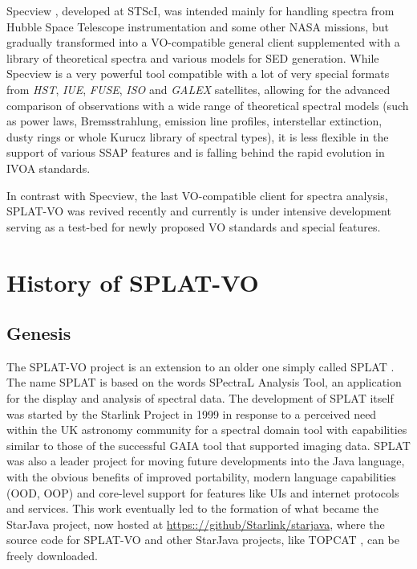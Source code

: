 \documentclass[final,authoryear,5p,times,twocolumn]{elsarticle}
\begin{document}
Specview \citep[][]{2002SPIE.4847..410B}, developed at
STScI, was intended mainly for handling spectra from Hubble Space
Telescope instrumentation and some other NASA missions, but gradually
transformed into a VO-compatible general client supplemented with a
library of theoretical spectra and various models for SED generation.
While Specview is a very powerful tool compatible with a lot of very
special formats from \emph{HST}, \emph{IUE}, \emph{FUSE}, \emph{ISO}
and \emph{GALEX} satellites, allowing for the advanced comparison of
observations with a wide range of theoretical spectral models (such as
power laws, Bremsstrahlung, emission line profiles, interstellar
extinction, dusty rings or whole Kurucz library of spectral types), it
is less flexible in the support of various SSAP features and is falling
behind the rapid evolution in IVOA standards.

In contrast with Specview, the last VO-compatible client for spectra analysis,
SPLAT-VO \citep[][]{sun243} was revived recently and currently
is under intensive development serving as a test-bed for newly proposed VO
standards and special features.




\section{History of SPLAT-VO}
\subsection{Genesis}

The SPLAT-VO project is an extension to an older one simply called
SPLAT \citep[][]{2002ASPC..281..513B}.  The name SPLAT
is based on the words SPectraL Analysis Tool, an application for the
display and analysis of spectral data. The development of SPLAT itself
was started by the Starlink Project \citep{1982QJRAS..23..485D} in
1999 in response to a perceived need within the UK astronomy community
for a spectral domain tool with capabilities similar to those of the
successful GAIA tool \citep[][]{2000ASPC..216..615D}
that supported imaging data. SPLAT was also a leader project for
moving future developments into the Java language, with the obvious
benefits of improved portability, modern language capabilities (OOD,
OOP) and core-level support for features like UIs and internet
protocols and services. This work eventually led to the formation of
what became the StarJava project, now hosted at
\url{https:://github/Starlink/starjava}, where the source code for
SPLAT-VO and other StarJava projects, like TOPCAT
\citep[][]{2005ASPC..347...29T}, can be freely
downloaded.
\end{document}
